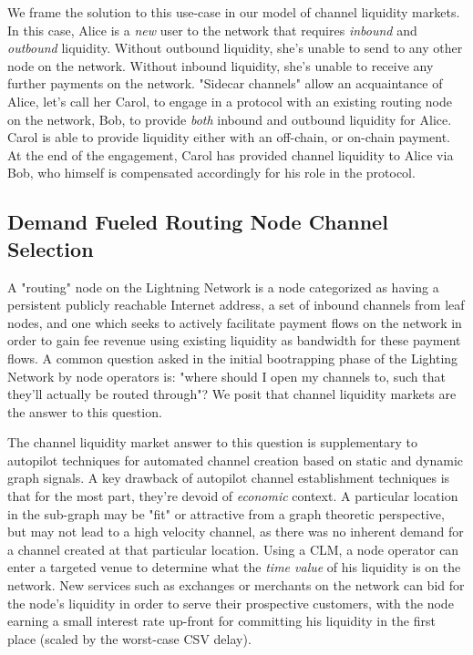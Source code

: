 \documentclass[10pt,a4paper]{article}
\theoremstyle{definition}
\begin{document}
We frame the solution to this use-case in our model of channel liquidity
markets. In this case, Alice is a \emph{new} user to the network that requires
\emph{inbound} and \emph{outbound} liquidity. Without outbound liquidity, she's
unable to send to any other node on the network. Without inbound liquidity,
she's unable to receive any further payments on the network. "Sidecar channels"
allow an acquaintance of Alice, let's call her
Carol, to engage in a protocol with an existing routing node on the network,
Bob, to provide \emph{both} inbound and outbound liquidity for Alice. Carol is
able to provide liquidity either with an off-chain, or on-chain payment. At the
end of the engagement, Carol has provided channel liquidity to Alice via Bob,
who himself is compensated accordingly for his role in the protocol. 

\subsection{Demand Fueled Routing Node Channel Selection}

A "routing" node on the Lightning Network is a node categorized as having a
persistent publicly reachable Internet address, a set of inbound channels from
leaf nodes, and one which seeks to actively facilitate payment flows on the
network in order to gain fee revenue using existing liquidity as
bandwidth for these payment flows. A common question asked in the initial
bootrapping phase of the Lighting Network by node operators is: "where should I
open my channels to, such that they'll actually be routed through"? We posit
that channel liquidity markets are the answer to this question.

The channel liquidity market answer to this question is supplementary to
autopilot \cite{autopilot} techniques for automated channel creation based on
static and dynamic graph signals. A key drawback of autopilot channel
establishment techniques is that for the most part, they're devoid of
\emph{economic} context. A particular location in the sub-graph may be "fit" or
attractive from a graph theoretic perspective, but may not lead to a high
velocity channel, as there was no inherent demand for a channel created at that
particular location. Using a CLM, a node operator can enter a targeted venue to
determine what the \emph{time value} of his liquidity is on the network. New
services such as exchanges or merchants on the network can bid for the node's
liquidity in order to serve their prospective customers, with the node earning
a small interest rate up-front for committing his liquidity in the first place
(scaled by the worst-case CSV delay). 
\end{document}
